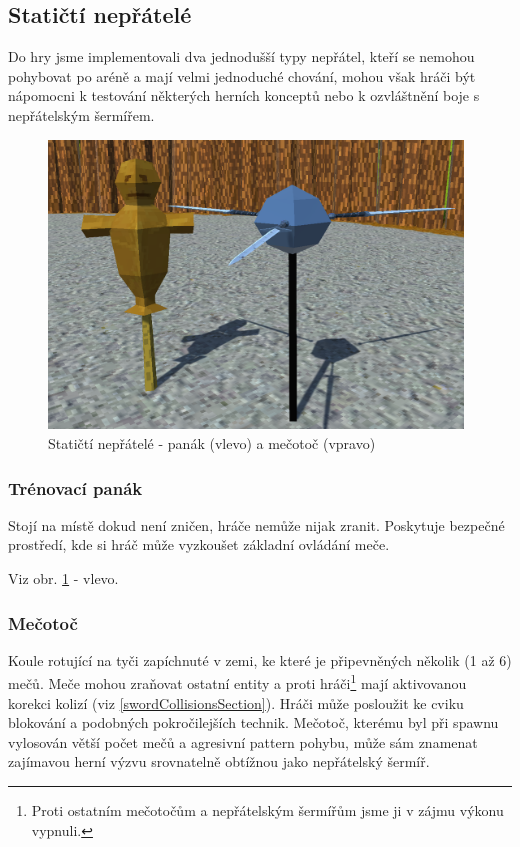 \subsection{Statičtí nepřátelé}

Do hry jsme implementovali dva jednodušší typy nepřátel, kteří se nemohou pohybovat po aréně a mají velmi jednoduché chování, mohou však hráči být nápomocni k testování některých herních konceptů nebo k ozvláštnění boje s nepřátelským šermířem.

\begin{figure}[h!]\centering
  \center
  \includegraphics[width=110mm]{../img/demogameStaticEnemies.png}
  \caption{Statičtí nepřátelé - panák (vlevo) a mečotoč (vpravo)}
  \label{obr05:demogameStaticEnemies}
\end{figure} 


\subsubsection*{Trénovací panák}

Stojí na místě dokud není zničen, hráče nemůže nijak zranit. Poskytuje bezpečné prostředí, kde si hráč může vyzkoušet základní ovládání meče. 

Viz obr. \ref{obr05:demogameStaticEnemies} - vlevo.

\subsubsection*{Mečotoč}

Koule rotující na tyči zapíchnuté v zemi, ke které je připevněných několik (1 až 6) mečů. Meče mohou zraňovat ostatní entity a proti hráči\footnote{Proti ostatním mečotočům a nepřátelským šermířům jsme ji v zájmu výkonu vypnuli.} mají aktivovanou korekci kolizí (viz \ref{swordCollisionsSection}). Hráči může posloužit ke cviku blokování a podobných pokročilejších technik. Mečotoč, kterému byl při spawnu vylosován větší počet mečů a agresivní pattern pohybu, může sám znamenat zajímavou herní výzvu srovnatelně obtížnou jako nepřátelský šermíř. 

